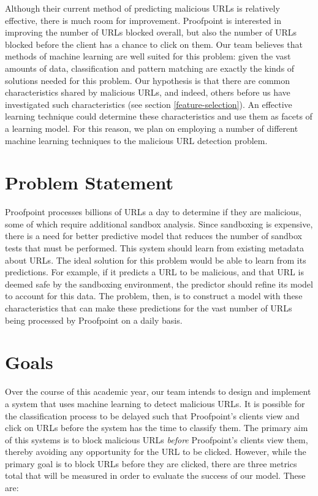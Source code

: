 \documentclass[cs,proposal]{hmcclinic}
\begin{document}
Although their current method of predicting malicious URLs is relatively effective, there is much room for improvement. Proofpoint is interested in improving the number of URLs blocked overall, but also the number of URLs blocked before the client has a chance to click on them. Our team believes that methods of machine learning are well suited for this problem: given the vast amounts of data, classification and pattern matching are exactly the kinds of solutions needed for this problem. Our hypothesis is that there are common characteristics shared by malicious URLs, and indeed, others before us have investigated such characteristics (see section \ref{feature-selection}). An effective learning technique could determine these characteristics and use them as facets of a learning model. For this reason, we plan on employing a number of different machine learning techniques to the malicious URL detection problem.


\section{Problem Statement}

Proofpoint processes billions of URLs a day to determine if they are malicious, some of which require additional sandbox analysis. Since sandboxing is expensive, there is a need for better predictive model that reduces the number of sandbox tests that must be performed. This system should learn from existing metadata about URLs. The ideal solution for this problem would be able to learn from its predictions. For example, if it predicts a URL to be malicious, and that URL is deemed safe by the sandboxing environment, the predictor should refine its model to account for this data. The problem, then, is to construct a model with these characteristics that can make these predictions for the vast number of URLs being processed by Proofpoint on a daily basis.


\section{Goals}

Over the course of this academic year, our team intends to design and implement a system that uses machine learning to detect malicious URLs. It is possible for the classification process to be delayed such that Proofpoint's clients view and click on URLs before the system has the time to classify them. The primary aim of this systems is to block malicious URLs \textit{before} Proofpoint's clients view them, thereby avoiding any opportunity for the URL to be clicked. However, while the primary goal is to block URLs before they are clicked, there are three metrics total that will be measured in order to evaluate the success of our model. These are:
\end{document}
